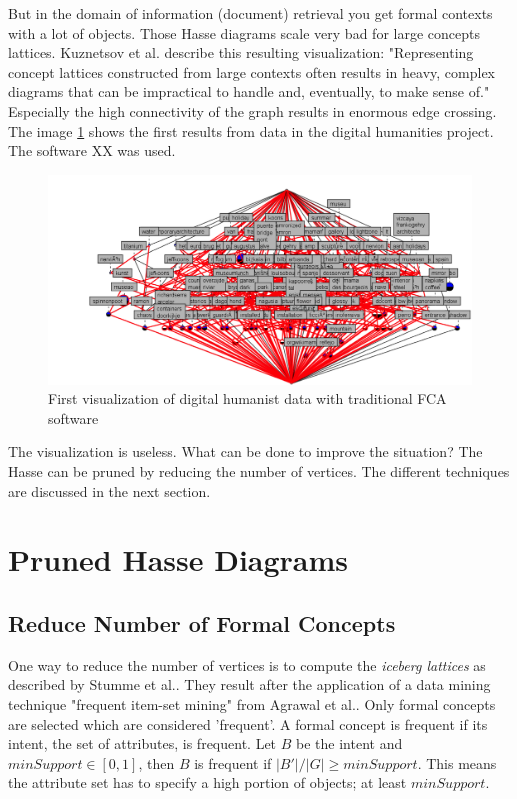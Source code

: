 \documentclass[11pt]{report}
\begin{document}
But in the domain of information (document) retrieval you get formal contexts with a lot of objects. Those Hasse diagrams scale very bad for large concepts lattices. Kuznetsov et al. \cite{Kuznetsov20072}  describe this resulting visualization: "Representing concept lattices constructed from large contexts often results in heavy, complex diagrams that can be impractical to handle and, eventually, to make sense of." Especially the high connectivity of the graph results in enormous edge crossing. The image \ref{figure:firstVisualizaion} shows the first results from data in the digital humanities project. The software XX was used. \\

\begin{figure}[h]
	\centering
	\includegraphics[width=\linewidth]{./images/firstVisualization}
\caption{First visualization of digital humanist data with traditional FCA software}
\label{figure:firstVisualizaion}
\end{figure}

The visualization is useless. What can be done to improve the situation? The Hasse can be pruned by reducing the number of vertices. The different techniques are discussed in the next section.

\section{Pruned Hasse Diagrams}

\subsection{Reduce Number of Formal Concepts}

One way to reduce the number of vertices is to compute the \textit{iceberg lattices} as described by Stumme et al.\cite{Stumme2002}. They result after the application of a data mining technique "frequent item-set mining" from Agrawal et al.\cite{Agrawal1993}. Only formal concepts are selected which are considered 'frequent'. A formal concept is frequent if its intent, the set of attributes, is frequent. Let $B$ be the intent and $minSupport \in [0, 1]$, then $B$ is frequent if $ |B'|/|G| \geq minSupport$. This means the attribute set has to specify a high portion of objects; at least $minSupport$. \\
\end{document}
